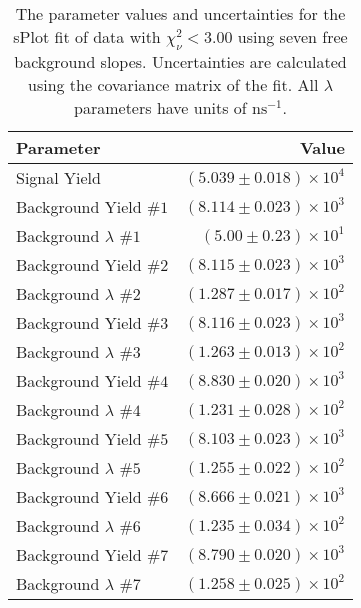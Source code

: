 
\begin{table}[h]
    \begin{center}
        \begin{tabular}{lr}\toprule
            Parameter & Value \\\midrule
            Signal Yield & $(5.039 \pm 0.018) \times 10^{4}$ \\
            Background Yield $\#1$ & $(8.114 \pm 0.023) \times 10^{3}$ \\
            Background $\lambda$ $\#1$ & $(5.00 \pm 0.23) \times 10^{1}$ \\
            Background Yield $\#2$ & $(8.115 \pm 0.023) \times 10^{3}$ \\
            Background $\lambda$ $\#2$ & $(1.287 \pm 0.017) \times 10^{2}$ \\
            Background Yield $\#3$ & $(8.116 \pm 0.023) \times 10^{3}$ \\
            Background $\lambda$ $\#3$ & $(1.263 \pm 0.013) \times 10^{2}$ \\
            Background Yield $\#4$ & $(8.830 \pm 0.020) \times 10^{3}$ \\
            Background $\lambda$ $\#4$ & $(1.231 \pm 0.028) \times 10^{2}$ \\
            Background Yield $\#5$ & $(8.103 \pm 0.023) \times 10^{3}$ \\
            Background $\lambda$ $\#5$ & $(1.255 \pm 0.022) \times 10^{2}$ \\
            Background Yield $\#6$ & $(8.666 \pm 0.021) \times 10^{3}$ \\
            Background $\lambda$ $\#6$ & $(1.235 \pm 0.034) \times 10^{2}$ \\
            Background Yield $\#7$ & $(8.790 \pm 0.020) \times 10^{3}$ \\
            Background $\lambda$ $\#7$ & $(1.258 \pm 0.025) \times 10^{2}$ \\\bottomrule
        \end{tabular}
        \caption{The parameter values and uncertainties for the sPlot fit of data with $\chi^2_\nu < 3.00$ using seven free background slopes. Uncertainties are calculated using the covariance matrix of the fit. All $\lambda$ parameters have units of $\si{\nano\second}^{-1}$.}
    \end{center}
\end{table}
